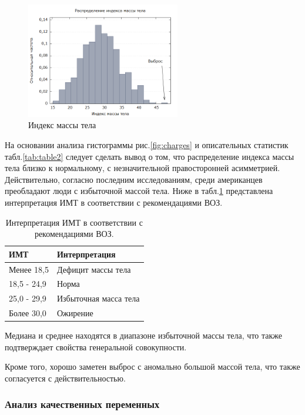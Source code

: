 \documentclass[a4paper,12pt]{article}
\begin{document}
\begin{figure}[H]
	\includegraphics[width=0.6\textwidth]{../[graphics]/bmi.png}
	\centering
	\caption{Индекс массы тела}
	\label{fig:bmi}
\end{figure}

На основании анализа гистограммы рис.\ref{fig:charges} и описательных статистик табл.\ref{tab:table2} следует сделать вывод о том, что распределение индекса массы тела близко к нормальному, с незначительной правосторонней асимметрией. Действительно, согласно последним исследованиям, среди американцев преобладают люди с избыточной массой тела. Ниже в табл.\ref{tab:bmi} представлена интерпретация ИМТ в соответствии с рекомендациями ВОЗ.

\begin{table}[H]
	\begin{center}
		\begin{tabular}{ | l | l |}
			\hline
			ИМТ & Интерпретация \\ \hline
			Менее 18,5 & Дефицит массы тела \\ \hline
			18,5 - 24,9 & Норма \\ \hline
			25,0 - 29,9 & Избыточная масса тела \\ \hline
			Более 30,0 & Ожирение \\ \hline
		\end{tabular}
	\end{center}
	\caption{Интерпретация ИМТ в соответствии с рекомендациями ВОЗ.}
	\label{tab:bmi}
\end{table}

Медиана и среднее находятся в диапазоне избыточной массы тела, что также подтверждает свойства генеральной совокупности.

Кроме того, хорошо заметен выброс с аномально большой массой тела, что также согласуется с действительностью.

\subsubsection{Анализ качественных переменных}
\end{document}
